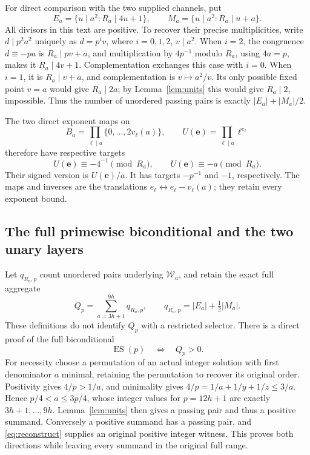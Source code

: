 \documentclass[11pt]{article}
\theoremstyle{definition}\newtheorem{definition}[theorem]{Definition}
\theoremstyle{remark}\newtheorem{remark}[theorem]{Remark}
\begin{document}
For direct comparison with the two supplied channels, put
\[
 E_a=\{u\mid a^2:R_a\mid4u+1\},\qquad
 M_a=\{u\mid a^2:R_a\mid u+a\}.
\]
All divisors in this text are positive.  To recover their precise
multiplicities, write \(d\mid p^2a^2\) uniquely as \(d=p^i v\),
where \(i=0,1,2\), \(v\mid a^2\).  When \(i=2\), the congruence
\(d\equiv-pa\) is \(R_a\mid pv+a\), and multiplication by
\(4p^{-1}\) modulo \(R_a\), using \(4a=p\), makes it
\(R_a\mid4v+1\).  Complementation exchanges this case with \(i=0\).
When \(i=1\), it is \(R_a\mid v+a\), and complementation is
\(v\mapsto a^2/v\).  Its only possible fixed point \(v=a\) would
give \(R_a\mid2a\); by Lemma~\ref{lem:units} this would give
\(R_a\mid2\), impossible.  Thus the number of unordered passing
pairs is exactly \(|E_a|+|M_a|/2\).

The two direct exponent maps on
\[
 B_a=\prod_{\ell\mid a}\{0,\ldots,2v_\ell(a)\},\qquad
 U(\boldsymbol e)=\prod_{\ell\mid a}\ell^{e_\ell}
\]
therefore have respective targets
\[
 U(\boldsymbol e)\equiv -4^{-1}\pmod{R_a},
 \qquad U(\boldsymbol e)\equiv-a\pmod{R_a}.
\]
Their signed version is \(U(\boldsymbol e)/a\).  It has targets
\(-p^{-1}\) and \(-1\), respectively.  The maps and inverses are
the translations \(e_\ell\leftrightarrow e_\ell-v_\ell(a)\);
they retain every exponent bound.

\subsection{The full primewise biconditional and the two unary layers}

Let \(q_{R_a,p}\) count unordered pairs underlying
\(\mathcal W_a\), and retain the exact full aggregate
\[
 Q_p=\sum_{a=3h+1}^{9h}q_{R_a,p},\qquad
 q_{R_a,p}=|E_a|+\tfrac12|M_a|.
\]
These definitions do not identify \(Q_p\) with a restricted
selector.  There is a direct proof of the full biconditional
\[
 \operatorname{ES}(p)\quad\Longleftrightarrow\quad Q_p>0.
\]
For necessity choose a permutation of an actual integer
solution with first denominator \(a\) minimal, retaining
the permutation to recover its original order.  Positivity
gives \(4/p>1/a\), and minimality gives
\(4/p=1/a+1/y+1/z\le3/a\).  Hence
\(p/4<a\le3p/4\), whose integer values for \(p=12h+1\)
are exactly \(3h+1,\ldots,9h\).  Lemma~\ref{lem:units}
then gives a passing pair and thus a positive summand.
Conversely a positive summand has a passing pair, and
\eqref{eq:reconstruct} supplies an original positive
integer witness.  This proves both directions while
leaving every summand in the original full range.
\end{document}
